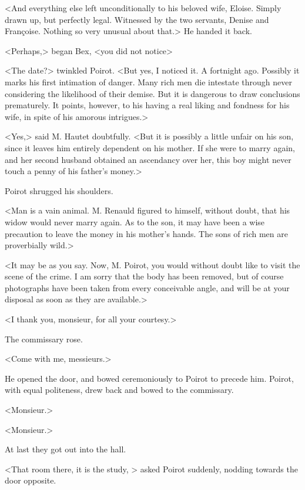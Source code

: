  <And everything else left unconditionally to his beloved wife, Eloise. Simply drawn up, but perfectly legal. Witnessed by the two servants, Denise and Françoise. Nothing so very unusual about that.> He handed it back. 

 <Perhaps,> began Bex, <you did not notice\longdash> 

 <The date?> twinkled Poirot. <But yes, I noticed it. A fortnight ago. Possibly it marks his first intimation of danger. Many rich men die intestate through never considering the likelihood of their demise. But it is dangerous to draw conclusions prematurely. It points, however, to his having a real liking and fondness for his wife, in spite of his amorous intrigues.> 

 <Yes,> said M. Hautet doubtfully. <But it is possibly a little unfair on his son, since it leaves him entirely dependent on his mother. If she were to marry again, and her second husband obtained an ascendancy over her, this boy might never touch a penny of his father's money.> 

 Poirot shrugged his shoulders. 

 <Man is a vain animal. M. Renauld figured to himself, without doubt, that his widow would never marry again. As to the son, it may have been a wise precaution to leave the money in his mother's hands. The sons of rich men are proverbially wild.> 

 <It may be as you say. Now, M. Poirot, you would without doubt like to visit the scene of the crime. I am sorry that the body has been removed, but of course photographs have been taken from every conceivable angle, and will be at your disposal as soon as they are available.> 

 <I thank you, monsieur, for all your courtesy.> 

 The commissary rose. 

 <Come with me, messieurs.> 
 

 

 He opened the door, and bowed ceremoniously to Poirot to precede him. Poirot, with equal politeness, drew back and bowed to the commissary. 

 <Monsieur.> 

 <Monsieur.> 

 At last they got out into the hall. 

 <That room there, it is the study, > asked Poirot suddenly, nodding towards the door opposite. 

